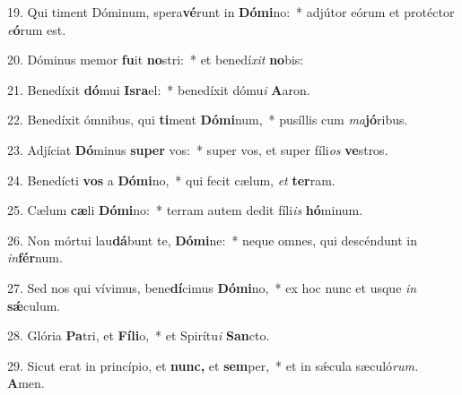 \item 19. Qui timent Dóminum, spera\textbf{vé}runt in \textbf{Dó}\textbf{mi}no:~* adjútor eórum et protéctor \textit{e}\textbf{ó}rum est.
\item 20. Dóminus memor \textbf{fu}it \textbf{no}stri:~* et benedí\textit{xit} \textbf{no}bis:
\item 21. Benedíxit \textbf{dó}mui \textbf{Is}\textbf{ra}el:~* benedíxit dómu\textit{i} \textbf{A}aron.
\item 22. Benedíxit ómnibus, qui \textbf{ti}ment \textbf{Dó}\textbf{mi}num,~* pusíllis cum \textit{ma}\textbf{jó}ribus.
\item 23. Adjíciat \textbf{Dó}minus \textbf{su}\textbf{per} vos:~* super vos, et super fíli\textit{os} \textbf{ve}stros.
\item 24. Benedícti \textbf{vos} a \textbf{Dó}\textbf{mi}no,~* qui fecit cælum, \textit{et} \textbf{ter}ram.
\item 25. Cælum \textbf{cæ}li \textbf{Dó}\textbf{mi}no:~* terram autem dedit fíli\textit{is} \textbf{hó}minum.
\item 26. Non mórtui lau\textbf{dá}bunt te, \textbf{Dó}\textbf{mi}ne:~* neque omnes, qui descéndunt in \textit{in}\textbf{fér}num.
\item 27. Sed nos qui vívimus, bene\textbf{dí}cimus \textbf{Dó}\textbf{mi}no,~* ex hoc nunc et usque \textit{in} \textbf{sǽ}culum.
\item 28. Glória \textbf{Pa}tri, et \textbf{Fí}\textbf{li}o,~* et Spirítu\textit{i} \textbf{San}cto.
\item 29. Sicut erat in princípio, et \textbf{nunc,} et \textbf{sem}per,~* et in sǽcula sæculó\textit{rum.} \textbf{A}men.
